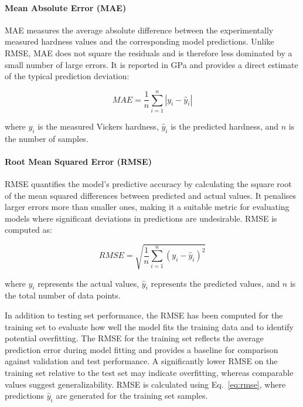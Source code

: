 \documentclass[pdflatex,sn-mathphys-num]{sn-jnl}%
\newif\ifrevmarks%
\newcommand{\revmark}[1]{\ifrevmarks\textcolor{revblue}{#1}\else#1\fi}%
\theoremstyle{thmstyleone}%
\theoremstyle{thmstyletwo}%
\theoremstyle{thmstylethree}%
\begin{document}
\paragraph{Mean Absolute Error (MAE)}
MAE measures the average absolute difference between the experimentally measured hardness values and the corresponding model predictions. Unlike RMSE, MAE does not square the residuals and is therefore less dominated by a small number of large errors. It is reported in GPa and provides a direct estimate of the typical prediction deviation:

\begin{equation}
MAE = \frac{1}{n} \sum_{i=1}^{n} |y_i - \hat{y}_i|
\end{equation}

where $y_i$ is the measured Vickers hardness, $\hat{y}_i$ is the predicted hardness, and $n$ is the number of samples.

\paragraph{Root Mean Squared Error (RMSE)}  
\revmark{RMSE quantifies the model’s predictive accuracy by calculating the square root of the mean squared differences between predicted and actual values. It penalises larger errors more than smaller ones, making it a suitable metric for evaluating models where significant deviations in predictions are undesirable. RMSE is computed as:}

\begin{equation}
\label{eq:rmse}
RMSE = \sqrt{\frac{1}{n} \sum_{i=1}^{n} (y_i - \hat{y}_i)^2}
\end{equation}

where $y_i$ represents the actual values, $\hat{y}_i$ represents the predicted values, and $n$ is the total number of data points.  

In addition to testing set performance, the RMSE has been computed for the training set to evaluate how well the model fits the training data and to identify potential overfitting. The RMSE for the training set reflects the average prediction error during model fitting and provides a baseline for comparison against validation and test performance. A significantly lower RMSE on the training set relative to the test set may indicate overfitting, whereas comparable values suggest generalizability. RMSE is calculated using Eq.~\eqref{eq:rmse}, where predictions $\hat{y}_i$ are generated for the training set samples.
\end{document}
